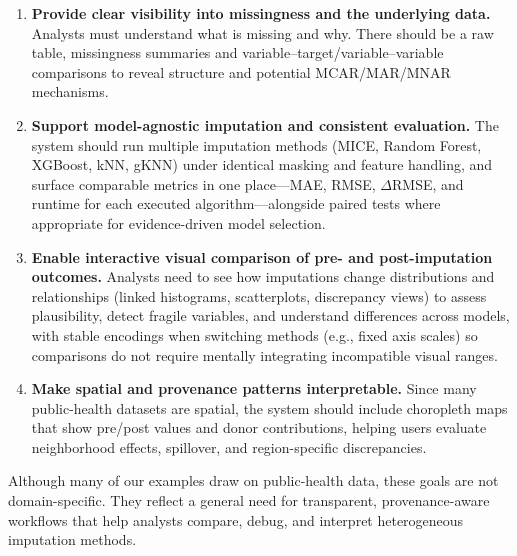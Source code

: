 \documentclass[review]{vgtc}
\begin{document}
\begin{enumerate}[label=\textbf{DG\arabic*}, leftmargin=*]
  \item \textbf{Provide clear visibility into missingness and the underlying data.} Analysts must understand what is missing and why. There should be a raw table, missingness summaries and variable--target/variable--variable comparisons to reveal structure and potential MCAR/MAR/MNAR mechanisms.
  \item \textbf{Support model-agnostic imputation and consistent evaluation.} The system should run multiple imputation methods (MICE, Random Forest, XGBoost, kNN, gKNN) under identical masking and feature handling, and surface comparable metrics in one place---MAE, RMSE, $\Delta$RMSE, and runtime for each executed algorithm---alongside paired tests where appropriate for evidence-driven model selection.
  \item \textbf{Enable interactive visual comparison of pre- and post-imputation outcomes.} Analysts need to see how imputations change distributions and relationships (linked histograms, scatterplots, discrepancy views) to assess plausibility, detect fragile variables, and understand differences across models, with stable encodings when switching methods (e.g., fixed axis scales) so comparisons do not require mentally integrating incompatible visual ranges.
  \item \textbf{Make spatial and provenance patterns interpretable.} Since many public-health datasets are spatial, the system should include choropleth maps that show pre/post values and donor contributions, helping users evaluate neighborhood effects, spillover, and region-specific discrepancies.
\end{enumerate}

Although many of our examples draw on public-health data, these goals are not domain-specific. They reflect a general need for transparent, provenance-aware workflows that help analysts compare, debug, and interpret heterogeneous imputation methods.
\end{document}
